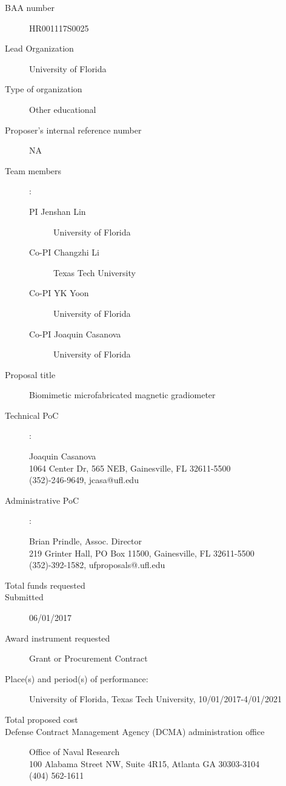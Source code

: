 \begin{description}
\item [BAA number] HR001117S0025
\item [Lead Organization] University of Florida
\item [Type of organization] Other educational
\item [Proposer’s internal reference number] NA
\item [Team members]:
  \begin{description}
  \item [PI Jenshan Lin] University of Florida 
  \item [Co-PI Changzhi Li] Texas Tech University
  \item [Co-PI YK Yoon] University of Florida 
  \item [Co-PI Joaquin Casanova] University of Florida 
  \end{description}
\item [Proposal title] Biomimetic microfabricated magnetic gradiometer
\item [Technical PoC]:
  \begin{description}
  \item [Joaquin Casanova]
  \item [1064 Center Dr, 565 NEB, Gainesville, FL 32611-5500]
  \item [(352)-246-9649, jcasa@ufl.edu]
  \end{description}
\item [Administrative PoC]:
  \begin{description}
  \item [Brian Prindle, Assoc. Director]
  \item [219 Grinter Hall, PO Box 11500, Gainesville, FL 32611-5500]
  \item [(352)-392-1582, ufproposals@.ufl.edu]
  \end{description}
\item [Total funds requested]
\item [Submitted] 06/01/2017
\item [Award instrument requested] Grant or Procurement Contract
\item [Place(s) and period(s) of performance:] University of Florida, Texas Tech University, 10/01/2017-4/01/2021
\item [Total proposed cost]
\item [Defense Contract Management Agency (DCMA) administration office]
  \begin{description}
  \item [Office of Naval Research]
  \item [100 Alabama Street NW, Suite 4R15, Atlanta GA 30303-3104]
  \item [(404) 562-1611]
  \end{description}


\end{description}

